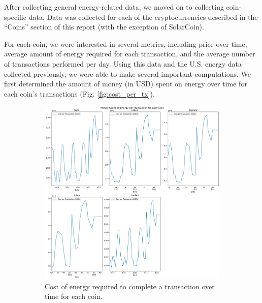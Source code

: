 \documentclass{article}
\begin{document}
After collecting general energy-related data, we moved on to collecting coin-specific data. Data was collected for each of the cryptocurrencies described in the ``Coins'' section of this report (with the exception of SolarCoin).

For each coin, we were interested in several metrics, including price over time, average amount of energy required for each transaction, and the average number of transactions performed per day. Using this data and the U.S. energy data collected previously, we were able to make several important computations. We first determined the amount of money (in USD) spent on energy over time for each coin's transactions (Fig. \ref{fig:cost_per_tx}). 

\begin{figure}[h!]
  \centering
  \begin{subfigure}[b]{0.5\linewidth}
    \includegraphics[width=\linewidth]{images/money_on_energy_per_transaction.png}
    \caption{Cost of energy required to complete a transaction over time for each coin.}
  \end{subfigure}
  \begin{subfigure}[b]{0.45\linewidth}

\end{subfigure}
\end{figure}
\end{document}
